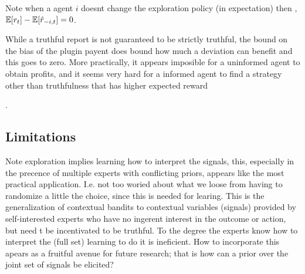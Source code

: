Note when a agent $i$ doesnt change the exploration policy (in expectation) then , $ \operatorname*{\mathbb E}[r_t] - \operatorname*{\mathbb E}[\hat{r}_{-i,t}] =0  $. 

While a truthful report is not guaranteed to be strictly truthful, the bound on the bias of the plugin payent does bound how much a deviation can benefit  and this goes to zero. More practically, it appears imposible for a uninformed agent to obtain profits, and it seems very hard for a informed agent to find a strategy other than truthfulness that has higher expected reward

 .










\subsection{Limitations}


Note exploration implies learning how to interpret the signals, this, especially in the precence of multiple experts with conflicting priors, appears like the most practical application. I.e. not too woried about what we loose from having to randomize a little the choice, since this is needed for learing. 
This is the generalization of contextual bandits to contextual variables (signals) provided by self-interested experts who have no ingerent interest in the outcome or action, but need t be incentivated to be truthful. 
To the degree the experts know how to interpret the (full set) learning to do it is ineficient. 
How to incorporate this apears as a fruitful avenue for future research; that is how can a prior over the joint set of signals be elicited? 




